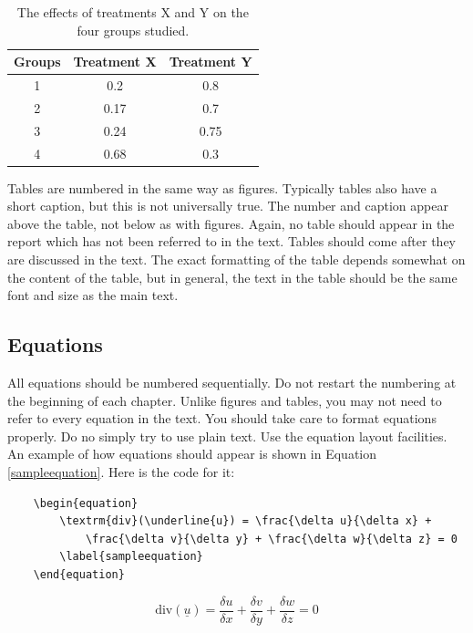 \begin{table}[b]
	\caption{The effects of treatments X and Y on the four groups studied.}
	\label{tab:treatments}
	\centering
	\setlength{\tabcolsep}{20pt}
	\renewcommand{\arraystretch}{1.5}
	\begin{tabular}{c c c}
		\hline
		\textbf{Groups} & \textbf{Treatment X} & \textbf{Treatment Y} \\
		\hline
		1 & 0.2 & 0.8\\
		2 & 0.17 & 0.7\\
		3 & 0.24 & 0.75\\
		4 & 0.68 & 0.3\\
		\hline
	\end{tabular}
\end{table}

Tables are numbered in the same way as figures. Typically tables also have a short caption, but this is not universally true. The number and caption appear above the table, not below as with figures. Again, no table should appear in the report which has not been referred to in the text. Tables should come after they are discussed in the text. The exact formatting of the table depends somewhat on the content of the table, but in general, the text in the table should be the same font and size as the main text. 

\subsection{Equations}
All equations should be numbered sequentially. Do not restart the numbering at the beginning of each chapter. Unlike figures and tables, you may not need to refer to every equation in the text. You should take care to format equations properly. Do no simply try to use plain text. Use the equation layout facilities. An example of how equations should appear is shown in Equation \ref{sampleequation}. Here is the code for it:

\begin{verbatim}
	\begin{equation}
		\textrm{div}(\underline{u}) = \frac{\delta u}{\delta x} + 
		    \frac{\delta v}{\delta y} + \frac{\delta w}{\delta z} = 0
		\label{sampleequation}
	\end{equation} 
\end{verbatim}

\begin{equation}
	\textrm{div}(\underline{u}) = \frac{\delta u}{\delta x} + \frac{\delta v}{\delta y} + \frac{\delta w}{\delta z} = 0
	\label{sampleequation}
\end{equation} 

